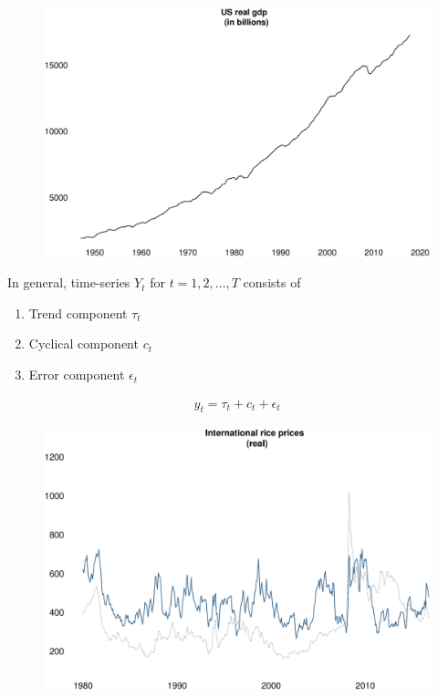\documentclass{beamer}
\begin{document}
\begin{frame}
  \begin{figure}
    \includegraphics[scale=.25]{us_gdp.eps}
  \end{figure}
\end{frame}

\begin{frame}
  In general, time-series $Y_t$ for $t=1,2,...,T$ consists of  
 \begin{enumerate}
   \item Trend component $\tau_t$
   \item Cyclical component $c_t$
   \item Error component $\epsilon_t$
 \end{enumerate}
 \begin{align}
   y_t=\tau_t + c_t + \epsilon_t
 \end{align}
\end{frame}

\begin{frame}
  \begin{figure}
    \includegraphics[scale=.3]{rice2.eps}
  \end{figure}
\end{frame}
\end{document}
